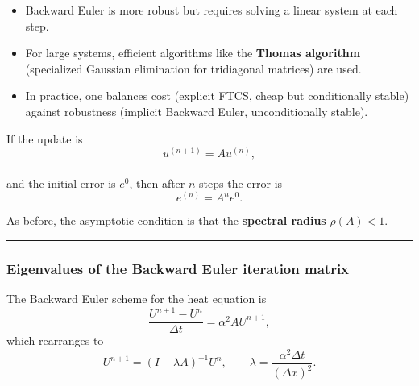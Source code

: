 \documentclass[
  letterpaper,
]{book}
\providecommand{\tightlist}{%
  \setlength{\itemsep}{0pt}\setlength{\parskip}{0pt}}
\begin{document}
\begin{itemize}
\tightlist
\item
  Backward Euler is more robust but requires solving a linear system at
  each step.\\
\item
  For large systems, efficient algorithms like the \textbf{Thomas
  algorithm} (specialized Gaussian elimination for tridiagonal matrices)
  are used.\\
\item
  In practice, one balances cost (explicit FTCS, cheap but conditionally
  stable) against robustness (implicit Backward Euler, unconditionally
  stable).
\end{itemize}

\begin{tcolorbox}[enhanced jigsaw, toprule=.15mm, opacityback=0, rightrule=.15mm, breakable, colframe=quarto-callout-note-color-frame, coltitle=black, toptitle=1mm, titlerule=0mm, left=2mm, bottomrule=.15mm, leftrule=.75mm, colback=white, colbacktitle=quarto-callout-note-color!10!white, bottomtitle=1mm, opacitybacktitle=0.6, title=\textcolor{quarto-callout-note-color}{\faInfo}\hspace{0.5em}{Why the Backward Euler scheme is unconditionally stable}, arc=.35mm]

If the update is\\
\[
u^{(n+1)} = A u^{(n)},
\]\\
and the initial error is \(e^0\), then after \(n\) steps the error is\\
\[
e^{(n)} = A^n e^0.
\]

As before, the asymptotic condition is that the \textbf{spectral radius}
\(\rho(A)<1\).

\begin{center}\rule{0.5\linewidth}{0.5pt}\end{center}

\subsubsection{Eigenvalues of the Backward Euler iteration
matrix}\label{eigenvalues-of-the-backward-euler-iteration-matrix}

The Backward Euler scheme for the heat equation is\\
\[
\frac{U^{n+1} - U^n}{\Delta t} = \alpha^2 A U^{n+1},
\] which rearranges to\\
\[
U^{n+1} = (I - \lambda A)^{-1} U^n, 
\qquad \lambda = \frac{\alpha^2 \Delta t}{(\Delta x)^2}.
\]


\end{tcolorbox}
\end{document}

